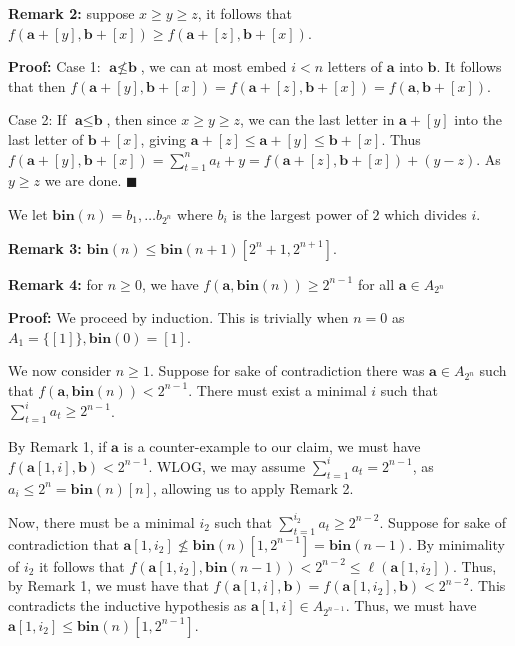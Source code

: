 \documentclass{article}
\begin{document}
\textbf{Remark 2:} suppose $x\ge y\ge z$, it follows that $f(\textbf{a}+[y],\textbf{b}+[x]) \ge f(\textbf{a}+[z],\textbf{b}+[x])$.

\textbf{Proof:} Case 1: $\textbf{a} \not \le \textbf{b}$, we can at most embed $i<n$ letters of $\textbf{a}$ into $\textbf{b}$. It follows that then $f(\textbf{a}+[y],\textbf{b}+[x])  =f(\textbf{a}+[z],\textbf{b}+[x])  = f(\textbf{a},\textbf{b}+[x])$. 

Case 2: If $\textbf{a}\le \textbf{b}$, then since $x \ge y\ge z$, we can the last letter in $\textbf{a}+[y]$ into the last letter of $\textbf{b}+[x]$, giving $\textbf{a}+[z]\le \textbf{a}+[y]\le \textbf{b}+[x]$. Thus $f(\textbf{a}+[y],\textbf{b}+[x]) = \sum_{t=1}^n a_t +y = f(\textbf{a}+[z],\textbf{b}+[x]) +(y-z)$. As $y \ge z$ we are done. $\blacksquare$


We let $\textbf{bin}(n) = b_1,\dots b_{2^n}$ where $b_i$ is the largest power of $2$ which divides $i$.



\textbf{Remark 3:} $\textbf{bin}(n)\le \textbf{bin}(n+1)[2^n+1,2^{n+1}]$.



\textbf{Remark 4:} for $n \ge 0$, we have $f(\textbf{a},\textbf{bin}(n))\ge 2^{n-1} $ for all $\textbf{a} \in A_{2^{n}}$

\textbf{Proof:} We proceed by induction. This is trivially  when $n = 0$ as $A_1 = \{[1]\},\textbf{bin}(0) = [1]$.

We now consider $n \ge 1$. Suppose for sake of contradiction there was $\textbf{a} \in A_{2^n}$ such that $f(\textbf{a},\textbf{bin}(n))<2^{n-1}$. There must exist a minimal $i$ such that $\sum_{t=1}^{i} a_t \ge 2^{n-1}$. 

By Remark 1, if $\textbf{a}$ is a counter-example to our claim, we must have $f(\textbf{a}[1,i],\textbf{b})<2^{n-1}$. WLOG, we may assume $\sum_{t=1}^i a_t = 2^{n-1}$, as $a_i \le 2^n = \textbf{bin}(n)[n]$, allowing us to apply Remark 2.

Now, there must be a minimal $i_2$ such that $\sum_{t=1}^{i_2} a_t \ge 2^{n-2}$. Suppose for sake of contradiction that $\textbf{a}[1,i_2] \not\le \textbf{bin}(n)[1,2^{n-1}] = \textbf{bin}(n-1)$. By minimality of $i_2$ it follows that $f(\textbf{a}[1,i_2],\textbf{bin}(n-1)) < 2^{n-2}\le \ell(\textbf{a}[1,i_2])$. Thus, by Remark 1, we must have that $f(\textbf{a}[1,i],\textbf{b}) = f(\textbf{a}[1,i_2],\textbf{b})<2^{n-2}$. This contradicts the inductive hypothesis as $\textbf{a}[1,i] \in A_{2^{n-1}}$. Thus, we must have $\textbf{a}[1,i_2]\le \textbf{bin}(n)[1,2^{n-1}]$.
\end{document}
